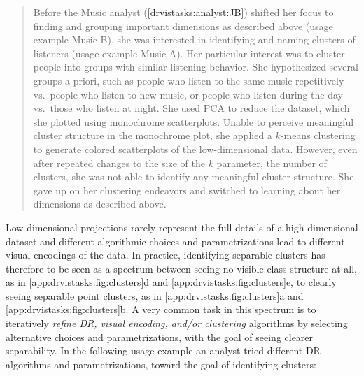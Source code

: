 \begin{quotation}
    Before the {\sc Music} analyst (\ref{drvistasks:analyst:JB}) shifted her focus to finding and grouping important dimensions as described above (usage example {\sc Music B}), she was interested in identifying and naming clusters of listeners (usage example {\sc Music A}).
    Her particular interest was to cluster people into groups with similar listening behavior.
    She hypothesized several groups a priori, such as people who listen to the same music repetitively vs.~people who listen to new music, or people who listen during the day vs.~those who listen at night. 
    She used \ac{PCA} to reduce the dataset, which she plotted using monochrome scatterplots.
    Unable to perceive meaningful cluster structure in the monochrome plot, she applied a $k$-means clustering to generate colored scatterplots of the low-dimensional data. However, even after repeated changes to the size of the $k$ parameter, the number of clusters, she was not able to identify any meaningful cluster structure. 
    She gave up on her clustering endeavors and switched to learning about her dimensions as described above.
\end{quotation}

Low-dimensional projections rarely represent the full details of a high-dimensional dataset and different algorithmic choices and parametrizations lead to different visual encodings of the data.
In practice, identifying separable clusters has therefore to be seen as a spectrum between seeing no visible class structure at all, as in \autoref{app:drvistasks:fig:clusters}d and \autoref{app:drvistasks:fig:clusters}e, to clearly seeing separable point clusters, as in \autoref{app:drvistasks:fig:clusters}a and \autoref{app:drvistasks:fig:clusters}b. 
A very common task in this spectrum is to iteratively {\it refine \ac{DR}, visual encoding, and/or clustering} algorithms by selecting alternative choices and parametrizations, with the goal of seeing clearer separability.
In the following usage example an analyst tried different \ac{DR} algorithms and parametrizations, toward the goal of identifying clusters:

